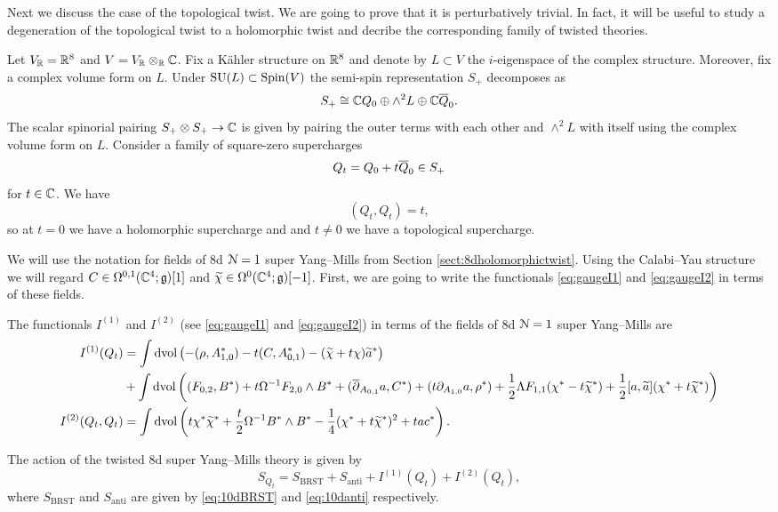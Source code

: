 \documentclass[10pt, oneside]{article}
\begin{document}
Next we discuss the case of the topological twist. We are going to prove that it is perturbatively trivial. In fact, it will be useful to study a degeneration of the topological twist to a holomorphic twist and decribe the corresponding family of twisted theories.

Let $V_\mathbb R = \mathbb R^8$ and $V=V_\mathbb R\otimes_\mathbb R\mathbb C$. Fix a K\"ahler structure on $\mathbb R^8$ and denote by $L\subset V$ the $i$-eigenspace of the complex structure. Moreover, fix a complex volume form on $L$. Under $\mathrm{SU}(L)\subset \mathrm{Spin}(V)$ the semi-spin representation $S_+$ decomposes as
\[S_+\cong \mathbb C Q_0\oplus \wedge^2 L\oplus \mathbb C \overline{Q}_0.\]
The scalar spinorial pairing $S_+\otimes S_+\rightarrow \mathbb C$ is given by pairing the outer terms with each other and $\wedge^2L$ with itself using the complex volume form on $L$. Consider a family of square-zero supercharges
\begin{equation}
Q_t = Q_0 + t\Bar{Q}_0\in S_+
\label{eq:8dHodgefamily}
\end{equation}
for $t\in\mathbb C$. We have
\[(Q_t, Q_t) = t,\]
so at $t=0$ we have a holomorphic supercharge and and $t\neq 0$ we have a topological supercharge.

We will use the notation for fields of 8d $\mathcal N=1$ super Yang--Mills from Section \ref{sect:8dholomorphictwist}. Using the Calabi--Yau structure we will regard $C\in\Omega^{0, 1}(\mathbb C^4;\mathfrak g)[1]$ and $\widetilde{\chi}\in\Omega^0(\mathbb C^4;\mathfrak g)[-1]$. First, we are going to write the functionals \eqref{eq:gaugeI1} and \eqref{eq:gaugeI2} in terms of these fields.

\begin{prop}
The functionals $I^{(1)}$ and $I^{(2)}$ (see \eqref{eq:gaugeI1} and \eqref{eq:gaugeI2}) in terms of the fields of 8d $\mathcal N=1$ super Yang--Mills are
\begin{align*}
I^{(1)}(Q_t) &= \int \operatorname{dvol}\left(-(\rho, A_{1, 0}^*) - t(C, A_{0, 1}^*) - (\widetilde{\chi} + t\chi)\widetilde{a}^*\right) \\
&+ \int\operatorname{dvol}\left((F_{0, 2}, B^*) + t\Omega^{-1} F_{2, 0}\wedge B^* + (\overline{\partial}_{A_{0, 1}} a, C^*) + (t\partial_{A_{1, 0}} a, \rho^*) + \frac{1}{2}\Lambda F_{1, 1}(\chi^* - t\widetilde{\chi}^*) + \frac{1}{2}[a, \widetilde{a}](\chi^*+t\widetilde{\chi}^*)\right) \\
I^{(2)}(Q_t, Q_t) &= \int \operatorname{dvol} \left(t\chi^*\widetilde{\chi}^* + \frac{t}{2}\Omega^{-1}B^*\wedge B^* -\frac{1}{4}(\chi^* + t\widetilde{\chi}^*)^2 + tac^*\right).
\end{align*}
\end{prop}

The action of the twisted 8d super Yang--Mills theory is given by
\[S_{Q_t} = S_{\mathrm{BRST}} + S_{\mathrm{anti}} + I^{(1)}(Q_t) + I^{(2)}(Q_t),\]
where $S_{\mathrm{BRST}}$ and $S_{\mathrm{anti}}$ are given by \eqref{eq:10dBRST} and \eqref{eq:10danti} respectively.
\end{document}
